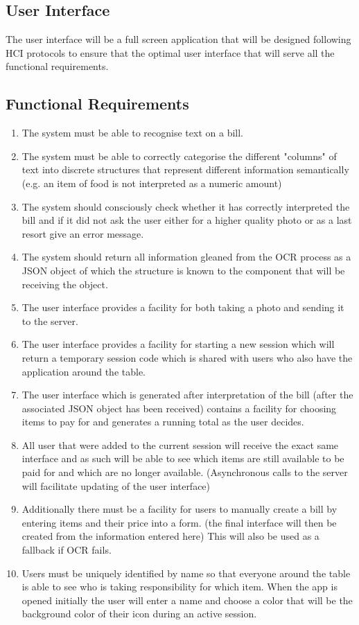 \documentclass[12pt,a4paper]{article}
\begin{document}
		\subsection{User Interface}
		The user interface will be a full screen application that will be designed following HCI protocols to ensure that the optimal user interface that will serve all the functional requirements.
	\subsection{Functional Requirements}
		\begin{enumerate}
				\item The system must be able to recognise text on a bill.
				\item The system must be able to correctly categorise the different "columns" of text into discrete structures that represent different information semantically (e.g. an item of food is not interpreted as a numeric amount)
				\item The system should consciously check whether it has correctly interpreted the bill and if it did not ask the user either for a higher quality photo or as a last resort give an error message.
				\item The system should return all information gleaned from the OCR process as a JSON object of which the structure is known to the component that will be receiving the object.
				\item The user interface provides a facility for both taking a photo and sending it to the server.
				\item The user interface provides a facility for starting a new session which will return a temporary session code which is shared with users who also have the application around the table.
				\item The user interface which is generated after interpretation of the bill (after the associated JSON object has been received) contains a  facility for choosing items to pay for and generates a running total as the user decides.
				\item All user that were added to the current session will receive the exact same interface and as such will be able to see which items are still available to be paid for and which are no longer available. (Asynchronous calls to the server will facilitate updating of the user interface)
				\item Additionally there must be a facility for users to manually create a bill by entering items and their price into a form. (the final interface will then be created from the information entered here) This will also be used as a fallback if OCR fails.
				\item Users must be uniquely identified by name so that everyone around the table is able to see who is taking responsibility for which item. When the app is opened initially the user will enter a name and choose a color that will be the background color of their icon during an active session.
			\end{enumerate}
\end{document}

